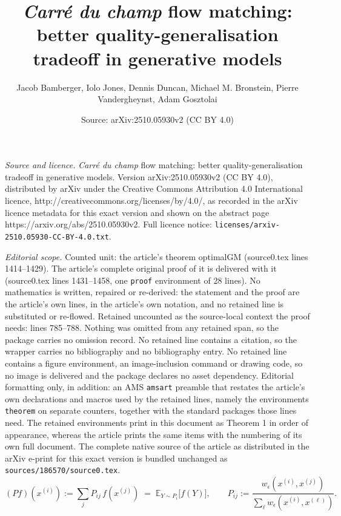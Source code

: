 \documentclass[10pt,a4paper]{amsart}
\title{\textit{Carr\'{e} du champ} flow matching: better quality-generalisation tradeoff in generative models}
\author{Jacob Bamberger, Iolo Jones, Dennis Duncan, Michael M. Bronstein, Pierre Vandergheynst, Adam Gosztolai}
\date{Source: arXiv:2510.05930v2 (CC BY 4.0)}
\newcommand{\E}{\mathbb{E}}
\begin{document}
\maketitle

\noindent\emph{Source and licence.} \textit{Carr\'{e} du champ} flow matching: better quality-generalisation tradeoff in generative models. Version arXiv:2510.05930v2 (CC BY 4.0), distributed by arXiv under the Creative Commons Attribution 4.0 International licence, http://creativecommons.org/licenses/by/4.0/, as recorded in the arXiv licence metadata for this exact version and shown on the abstract page https://arxiv.org/abs/2510.05930v2. Full licence notice: \texttt{licenses/arxiv-2510.05930-CC-BY-4.0.txt}.\par\smallskip

\noindent\textit{Editorial scope.} Counted unit: the article's theorem optimalGM (source0.tex lines 1414--1429). The article's complete original proof of it is delivered with it (source0.tex lines 1431--1458, one \texttt{proof} environment of 28 lines). No mathematics is written, repaired or re-derived: the statement and the proof are the article's own lines, in the article's own notation, and no retained line is substituted or re-flowed.  Retained uncounted as the source-local context the proof needs: lines 785--788.  Nothing was omitted from any retained span, so the package carries no omission record.  No retained line contains a citation, so the wrapper carries no bibliography and no bibliography entry.  No retained line contains a figure environment, an image-inclusion command or drawing code, so no image is delivered and the package declares no asset dependency.  Editorial formatting only, in addition: an AMS \texttt{amsart} preamble that restates the article's own declarations and macros used by the retained lines, namely the environments \texttt{theorem} on separate counters, together with the standard packages those lines need.  The retained environments print in this document as Theorem 1 in order of appearance, whereas the article prints the same items with the numbering of its own full document.  The complete native source of the article as distributed in the arXiv e-print for this exact version is bundled unchanged as \texttt{sources/186570/source0.tex}.
\begin{equation}\label{eq:markov_kernel}
    (Pf)(x^{(i)}) := \sum_j P_{ij}\,f(x^{(j)}) \;=\; \E_{Y\sim P_i}\!\big[f(Y)\big],
\qquad P_{ij} := \frac{w_\epsilon(x^{(i)},x^{(j)})}{\sum_\ell w_\epsilon(x^{(i)},x^{(\ell)})}.
\end{equation}
\end{document}
